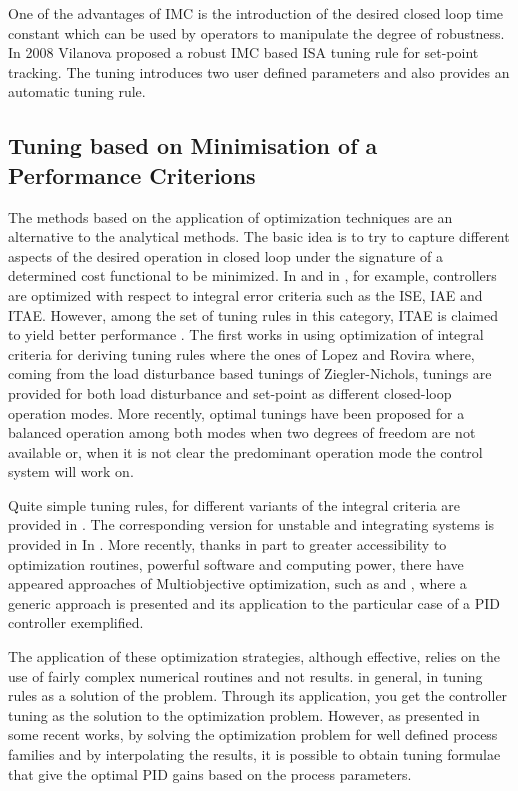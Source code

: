 One of the advantages of IMC is the introduction of the desired closed loop time constant which can be used by operators to manipulate the degree of robustness. In 2008 Vilanova \cite{vilanovaJPC2008}  proposed a robust IMC based ISA tuning rule for set-point tracking. The tuning introduces two user defined parameters and also provides an automatic tuning rule.


\subsection{Tuning based on Minimisation of a Performance Criterions}

The methods based on the application of optimization techniques are an alternative to the analytical methods.
The basic idea is to try to capture different aspects of the desired operation in closed loop under the signature of a determined cost functional to be minimized. In \cite{corripio2001} and in \cite{shinskey.1994}, for example, controllers are  optimized with respect to integral error criteria such as the  ISE, IAE and ITAE.  However, among the
set of tuning rules in this category, ITAE is claimed to yield better performance \cite{ogatabook}. The first works in using optimization of integral criteria for deriving tuning rules where the ones of Lopez \cite{lopez1967} and Rovira \cite{rovira1969}   where, coming from the load disturbance based tunings of Ziegler-Nichols, tunings are provided for both load disturbance and set-point as different closed-loop operation modes. More recently, optimal tunings have been proposed \cite{arrieta2010} for a balanced operation among both modes when two degrees of freedom are not available or, when it is not clear the predominant operation mode the control system will work on.

Quite simple tuning rules, for different variants of the integral criteria are provided in \cite{zhuang1993} . The corresponding version for unstable and integrating systems is provided in In \cite{visioli2001}. More recently, thanks in part to greater accessibility to optimization routines, powerful software and computing power, there have appeared approaches of Multiobjective optimization, such as \cite{herreros2002}  and \cite{toivonen2006}, where a generic approach is presented and its application to the particular case of a PID controller exemplified. 

The application of these optimization strategies, although effective, relies on the use of fairly complex numerical routines and not results. in general, in tuning rules as a solution of the problem. Through its application, you get the controller tuning as the solution to the optimization problem. However, as presented in some recent works, by solving the optimization problem for well defined process families and by interpolating the results, it is possible to obtain tuning formulae that give the optimal PID gains based on the process parameters. 


